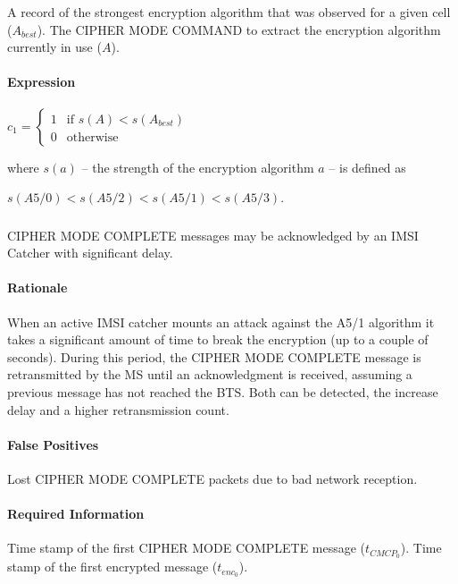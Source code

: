 \documentclass[a4paper,11pt,notitlepage,bigheadings,oneside]{scrartcl}
\begin{document}
A record of the strongest encryption algorithm that was observed for a given
cell ($A_{best}$). The CIPHER MODE COMMAND to extract the encryption algorithm
currently in use ($A$).

\paragraph{Expression}

$c_1 =
\begin{cases}
	1 & \text{if } s(A) < s(A_{best}) \\
	0 & \text{otherwise}
\end{cases}$

where $s(a)$ -- the strength of the encryption algorithm $a$ -- is defined as

$s(A5/0) < s(A5/2) < s(A5/1) < s(A5/3)$.

\subsubsection{}

CIPHER MODE COMPLETE messages may be acknowledged by an IMSI Catcher with
significant delay.

\paragraph{Rationale}

When an active IMSI catcher mounts an attack against the A5/1 algorithm it
takes a significant amount of time to break the encryption (up to a couple of
seconds). During this period, the CIPHER MODE COMPLETE message is retransmitted
by the MS until an acknowledgment is received, assuming a previous message has
not reached the BTS. Both can be detected, the increase delay and a higher
retransmission count.

\paragraph{False Positives}

Lost CIPHER MODE COMPLETE packets due to bad network reception.

\paragraph{Required Information}

Time stamp of the first CIPHER MODE COMPLETE message ($t_{CMCP_0}$).
Time stamp of the first encrypted message ($t_{enc_0}$).
\end{document}
